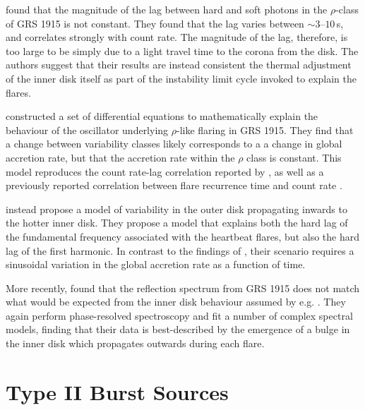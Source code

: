 \par \citealp{Massa_MoveLag} found that the magnitude of the lag between hard and soft photons in the $\rho$-class of GRS 1915 is not constant.  They found that the lag varies between $\sim3$--$10$\,s, and correlates strongly with count rate.  The magnitude of the lag, therefore, is too large to be simply due to a light travel time to the corona from the disk.  The authors suggest that their results are instead consistent the thermal adjustment of the inner disk itself as part of the instability limit cycle invoked to explain the flares.
\par \citealp{Massaro_Numerical} constructed a set of differential equations to mathematically explain the behaviour of the oscillator underlying $\rho$-like flaring in GRS 1915.  They find that a change between variability classes likely corresponds to a a change in global accretion rate, but that the accretion rate within the $\rho$ class is constant.  This model reproduces the count rate-lag correlation reported by \citealp{Massa_MoveLag}, as well as a previously reported correlation between flare recurrence time and count rate \citep{Massaro_Lag}.
\par \citealp{Mir_LagModel} instead propose a model of variability in the outer disk propagating inwards to the hotter inner disk.  They propose a model that explains both the hard lag of the fundamental frequency associated with the heartbeat flares, but also the hard lag of the first harmonic.  In contrast to the findings of \citealp{Massaro_Numerical}, their scenario requires a sinusoidal variation in the global accretion rate as a function of time.
\par More recently, \citealp{Zoghbi_Bulge} found that the reflection spectrum from GRS 1915 does not match what would be expected from the inner disk behaviour assumed by e.g. \citealp{Nayakshin_GRSModel}.  They again perform phase-resolved spectroscopy and fit a number of complex spectral models, finding that their data is best-described by the emergence of a bulge in the inner disk which propagates outwards during each flare.

\section{Type II Burst Sources}

\label{sec:TypeII}

